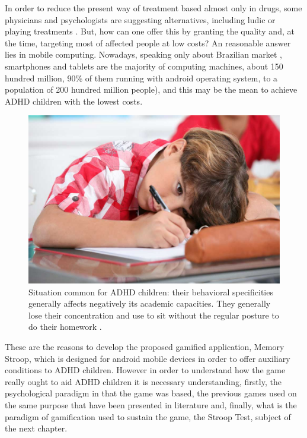 In order to reduce the present way of treatment based almost only in drugs, some physicians and psychologists are suggesting alternatives, including ludic or playing treatments \citep{Psychoanalytic, brainGames}. But, how can one offer this by granting the quality and, at the time, targeting most of affected people at low costs? An reasonable answer lies in mobile computing. Nowadays, speaking only about Brazilian market \citep{idcTablets}, smartphones and tablets are the majority of computing machines, about 150 hundred million, 90\% of them running with android operating system, to a population of 200 hundred million people\citep{idcTablets}), and this may be the mean to achieve ADHD children with the lowest costs. 





\begin{figure}[htp]

	\begin{center}

		\includegraphics[scale=0.35]{chapters/adhd/img/adhd_child.jpeg}

		\caption{Situation common for ADHD children: their behavioral specificities generally affects negatively its academic capacities. They generally lose their concentration and use to sit without the regular posture to do their homework \citep{child_example}.}

		\label{child}

	\end{center}

\end{figure}



These are the reasons to develop the proposed gamified application, Memory Stroop, which is designed for android mobile devices in order to offer auxiliary conditions to ADHD children. However in order to understand how the game really ought to aid ADHD children it is necessary understanding, firstly, the psychological paradigm in that the game was based, the previous games used on the same purpose that have been presented in literature and, finally, what is the paradigm of gamification used to sustain the game, the Stroop Test, subject of the next chapter. 

